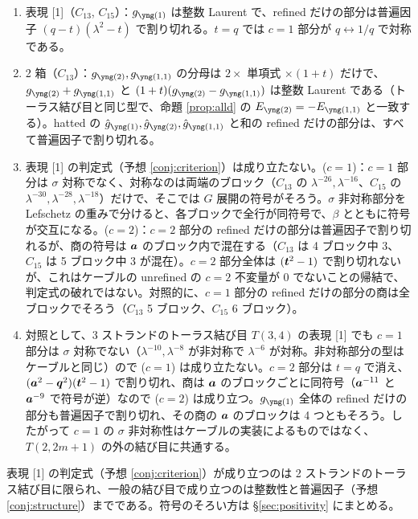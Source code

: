 \begin{compresult}\label{cr:cable-largeN}
\begin{enumerate}
\item 表現 [1]（$C_{13}$, $C_{15}$）：$g_{\yone}$ は整数 Laurent で、refined だけの部分は普遍因子 $(q-t)(\lambda^2-t)$ で割り切れる。$t = q$ では $c = 1$ 部分が $q \leftrightarrow 1/q$ で対称である。
\item 2 箱（$C_{13}$）：$g_{\ytwo}, g_{\yoneone}$ の分母は $2\times$ 単項式 $\times(1+t)$ だけで、$g_{\ytwo} + g_{\yoneone}$ と $(1+t)(g_{\ytwo} - g_{\yoneone})$ は整数 Laurent である（トーラス結び目と同じ型で、命題 \ref{prop:alld} の $E_{\ytwo} = -E_{\yoneone}$ と一致する）。hatted の $\hat g_{\yone}, \hat g_{\ytwo}, \hat g_{\yoneone}$ と和の refined だけの部分は、すべて普遍因子で割り切れる。
\item 表現 [1] の判定式（予想 \ref{conj:criterion}）は成り立たない。($c{=}1$)：$c = 1$ 部分は $\sigma$ 対称でなく、対称なのは両端のブロック（$C_{13}$ の $\lambda^{-26}, \lambda^{-16}$、$C_{15}$ の $\lambda^{-30}, \lambda^{-28}, \lambda^{-18}$）だけで、そこでは $G$ 展開の符号がそろう。$\sigma$ 非対称部分を Lefschetz の重みで分けると、各ブロックで全行が同符号で、$\beta$ とともに符号が交互になる。($c{=}2$)：$c = 2$ 部分の refined だけの部分は普遍因子で割り切れるが、商の符号は $\bm{a}$ のブロック内で混在する（$C_{13}$ は 4 ブロック中 3、$C_{15}$ は 5 ブロック中 3 が混在）。$c = 2$ 部分全体は $(\bm{t}^2-1)$ で割り切れないが、これはケーブルの unrefined の $c = 2$ 不変量が 0 でないことの帰結で、判定式の破れではない。対照的に、$c = 1$ 部分の refined だけの部分の商は全ブロックでそろう（$C_{13}$ 5 ブロック、$C_{15}$ 6 ブロック）。
\item 対照として、3 ストランドのトーラス結び目 $T(3,4)$ の表現 [1] でも $c = 1$ 部分は $\sigma$ 対称でない（$\lambda^{-10}, \lambda^{-8}$ が非対称で $\lambda^{-6}$ が対称。非対称部分の型はケーブルと同じ）ので ($c{=}1$) は成り立たない。$c = 2$ 部分は $t = q$ で消え、$(\bm{a}^2-\bm{q}^2)(\bm{t}^2-1)$ で割り切れ、商は $\bm{a}$ のブロックごとに同符号（$\bm{a}^{-11}$ と $\bm{a}^{-9}$ で符号が逆）なので ($c{=}2$) は成り立つ。$g_{\yone}$ 全体の refined だけの部分も普遍因子で割り切れ、その商の $\bm{a}$ のブロックは 4 つともそろう。したがって $c = 1$ の $\sigma$ 非対称性はケーブルの実装によるものではなく、$T(2,2m+1)$ の外の結び目に共通する。
\end{enumerate}
\end{compresult}
表現 [1] の判定式（予想 \ref{conj:criterion}）が成り立つのは 2 ストランドのトーラス結び目に限られ、一般の結び目で成り立つのは整数性と普遍因子（予想 \ref{conj:structure}）までである。符号のそろい方は §\ref{sec:positivity} にまとめる。
